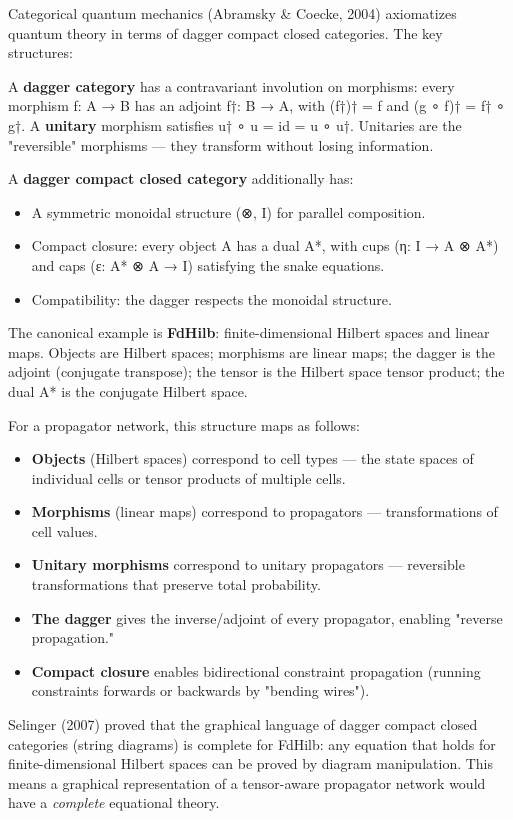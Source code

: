 \documentclass[11pt]{article}
\begin{document}
Categorical quantum mechanics (Abramsky \& Coecke, 2004) axiomatizes quantum
theory in terms of dagger compact closed categories. The key structures:

A \textbf{dagger category} has a contravariant involution on morphisms: every morphism
f: A → B has an adjoint f†: B → A, with (f†)† = f and (g ∘ f)† = f† ∘ g†.
A \textbf{unitary} morphism satisfies u† ∘ u = id = u ∘ u†. Unitaries are the
"reversible" morphisms --- they transform without losing information.

A \textbf{dagger compact closed category} additionally has:
\begin{itemize}
\item A symmetric monoidal structure (⊗, I) for parallel composition.
\item Compact closure: every object A has a dual A*, with cups (η: I → A ⊗ A*) and
caps (ε: A* ⊗ A → I) satisfying the snake equations.
\item Compatibility: the dagger respects the monoidal structure.
\end{itemize}

The canonical example is \textbf{FdHilb}: finite-dimensional Hilbert spaces and linear
maps. Objects are Hilbert spaces; morphisms are linear maps; the dagger is the
adjoint (conjugate transpose); the tensor is the Hilbert space tensor product;
the dual A* is the conjugate Hilbert space.

For a propagator network, this structure maps as follows:
\begin{itemize}
\item \textbf{Objects} (Hilbert spaces) correspond to cell types --- the state spaces of
individual cells or tensor products of multiple cells.
\item \textbf{Morphisms} (linear maps) correspond to propagators --- transformations of
cell values.
\item \textbf{Unitary morphisms} correspond to unitary propagators --- reversible
transformations that preserve total probability.
\item \textbf{The dagger} gives the inverse/adjoint of every propagator, enabling
"reverse propagation."
\item \textbf{Compact closure} enables bidirectional constraint propagation (running
constraints forwards or backwards by "bending wires").
\end{itemize}

Selinger (2007) proved that the graphical language of dagger compact closed
categories (string diagrams) is complete for FdHilb: any equation that holds
for finite-dimensional Hilbert spaces can be proved by diagram manipulation.
This means a graphical representation of a tensor-aware propagator network
would have a \emph{complete} equational theory.
\end{document}
